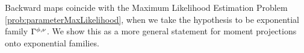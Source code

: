 

Backward maps coincide with the Maximum Likelihood Estimation Problem \eqref{prob:parameterMaxLikelihood}, when we take the hypothesis to be exponential family $\Gamma^{\phi,\nu}$. %
We show this as a more general statement for moment projections onto exponential families.

